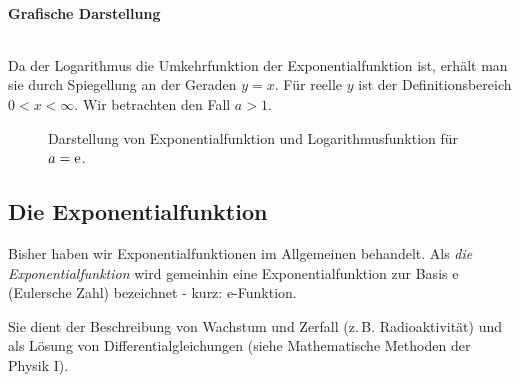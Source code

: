 \newpage
\paragraph{Grafische Darstellung}$~$

Da der Logarithmus die Umkehrfunktion der Exponentialfunktion ist, erhält man sie durch Spiegellung an der Geraden $y=x$. Für reelle $y$ ist der Definitionsbereich $0 < x < \infty$. Wir betrachten den Fall $a > 1$.
\begin{figure}[htp]
    \centering
    \caption{Darstellung von Exponentialfunktion und Logarithmusfunktion für $a = \mathrm{e}$.}
    \label{}
\end{figure}


\subsection{Die Exponentialfunktion}
Bisher haben wir Exponentialfunktionen im Allgemeinen behandelt. Als \emph{die Exponentialfunktion} wird gemeinhin eine Exponentialfunktion zur Basis e (Eulersche Zahl) bezeichnet - kurz: e-Funktion.

Sie dient der Beschreibung von Wachstum und Zerfall (z.\,B. Radioaktivität) und als Lösung von Differentialgleichungen (siehe Mathematische Methoden der Physik I).

